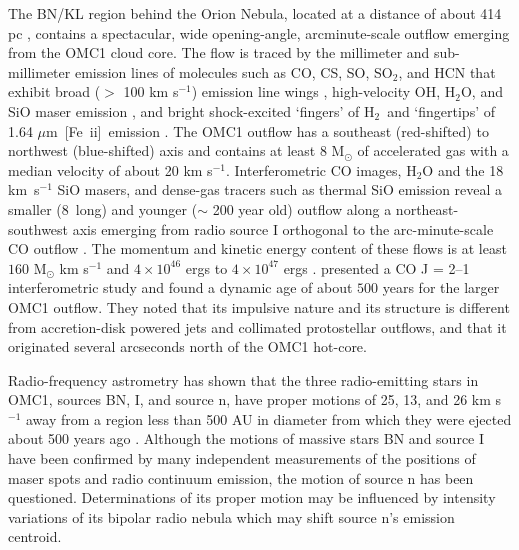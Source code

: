 \documentclass{aa}
\newcommand{\Feii}{[Fe~{\sc ii}]}
\newcommand{\um}{$\mu$m}
\newcommand{\hh}{\ensuremath{\textrm{H}_{2}}}			%
\begin{document}
The BN/KL region behind the Orion Nebula, located at a distance of about
414 pc \citep{Menten2007},  contains a spectacular,  wide opening-angle, 
arcminute-scale outflow emerging from the OMC1 cloud core.  The flow is 
traced by the millimeter and sub-millimeter emission lines of molecules 
such as CO, CS, SO, SO$_2$, and HCN  that exhibit  broad  
($>$ 100 km s$^{-1}$)  emission line wings 
\citep{KwanScoville1976, WisemanHo1996, FuruyaShinnaga2009},  
high-velocity OH, H$_2$O,  and SiO maser  emission \citep{Genzel1981,Greenhill1998}, 
and bright shock-excited `fingers' of  \hh\   and `fingertips' of 1.64 \um\  \Feii\   
emission \citep{AllenBurton93, Colgan2007, Nissen2007, 
LeeBurton2000, Bally2011}.    The OMC1 outflow has a southeast 
(red-shifted) to  northwest (blue-shifted) axis and contains  at least 8 M$_{\odot}$ of  
accelerated gas with a median velocity of about  20 km s$^{-1}$.     Interferometric 
CO images, H$_2$O and the 18 km~s$^{-1}$  SiO masers,   and dense-gas  
tracers such as  thermal SiO emission reveal a  smaller (8\arcsec\  long) 
and younger  ($\sim$ 200  year old) outflow along a  northeast-southwest axis 
emerging  from radio source I   orthogonal to the arc-minute-scale  CO outflow  
\citep{BeutherNissen2008,Plambeck2009}.    
The  momentum and kinetic   energy content of these flows is at least  
$160$ M$_{\odot}$ km s$^{-1}$ and  $4 \times 10^{46}$  ergs  \citep{Snell1984} to  
$4 \times 10^{47}$ ergs  \citep{KwanScoville1976}.     \citet{Zapata2009}  presented 
a CO J = 2--1 interferometric study and found a dynamic age of  about $500$ 
years for the larger OMC1 outflow.   They noted that its impulsive nature and 
its  structure is  different from accretion-disk  powered  jets and collimated 
protostellar outflows,  and that it  originated several arcseconds 
north of the  OMC1 hot-core.       

Radio-frequency astrometry has shown that
the three  radio-emitting stars in OMC1, sources BN, I, and 
source n, have  proper motions  of 25, 13, and 26 km s$^{-1}$ 
away from a region less than 500 AU in diameter from which they were ejected 
about  500 years ago \citep{Rodriguez2005, Gomez2005,Gomez2008}.    Although
the motions of massive stars BN and source I have been confirmed by many 
independent measurements of the positions of maser spots and radio continuum 
emission,  the motion of source n has been questioned.  Determinations of its  
proper  motion may be influenced by intensity variations of its bipolar radio nebula 
which may shift source n's  emission centroid. 
  
\end{document}
